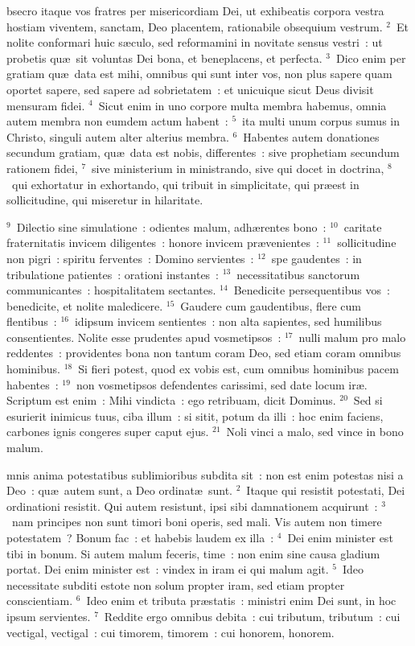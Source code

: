 \bchapter
{}bsecro itaque vos fratres per misericordiam Dei, ut exhibeatis corpora vestra hostiam viventem, sanctam, Deo placentem, rationabile obsequium vestrum.
${}^{2}$~Et nolite conformari huic s\ae culo, sed reformamini in novitate sensus vestri~: ut probetis qu\ae\ sit voluntas Dei bona, et beneplacens, et perfecta.
${}^{3}$~Dico enim per gratiam qu\ae\ data est mihi, omnibus qui sunt inter vos, non plus sapere quam oportet sapere, sed sapere ad sobrietatem~: et unicuique sicut Deus divisit mensuram fidei.
${}^{4}$~Sicut enim in uno corpore multa membra habemus, omnia autem membra non eumdem actum habent~:
${}^{5}$~ita multi unum corpus sumus in Christo, singuli autem alter alterius membra.
${}^{6}$~Habentes autem donationes secundum gratiam, qu\ae\ data est nobis, differentes~: sive prophetiam secundum rationem fidei,
${}^{7}$~sive ministerium in ministrando, sive qui docet in doctrina,
${}^{8}$~qui exhortatur in exhortando, qui tribuit in simplicitate, qui pr\ae est in sollicitudine, qui miseretur in hilaritate.


${}^{9}$~Dilectio sine simulatione~: odientes malum, adh\ae rentes bono~:
${}^{10}$~caritate fraternitatis invicem diligentes~: honore invicem pr\ae venientes~:
${}^{11}$~sollicitudine non pigri~: spiritu ferventes~: Domino servientes~:
${}^{12}$~spe gaudentes~: in tribulatione patientes~: orationi instantes~:
${}^{13}$~necessitatibus sanctorum communicantes~: hospitalitatem sectantes.
${}^{14}$~Benedicite persequentibus vos~: benedicite, et nolite maledicere.
${}^{15}$~Gaudere cum gaudentibus, flere cum flentibus~:
${}^{16}$~idipsum invicem sentientes~: non alta sapientes, sed humilibus consentientes. Nolite esse prudentes apud vosmetipsos~:
${}^{17}$~nulli malum pro malo reddentes~: providentes bona non tantum coram Deo, sed etiam coram omnibus hominibus.
${}^{18}$~Si fieri potest, quod ex vobis est, cum omnibus hominibus pacem habentes~:
${}^{19}$~non vosmetipsos defendentes carissimi, sed date locum ir\ae . Scriptum est enim~: Mihi vindicta~: ego retribuam, dicit Dominus.
${}^{20}$~Sed si esurierit inimicus tuus, ciba illum~: si sitit, potum da illi~: hoc enim faciens, carbones ignis congeres super caput ejus.
${}^{21}$~Noli vinci a malo, sed vince in bono malum.

\bchapter
{}mnis anima potestatibus sublimioribus subdita sit~: non est enim potestas nisi a Deo~: qu\ae\ autem sunt, a Deo ordinat\ae\ sunt.
${}^{2}$~Itaque qui resistit potestati, Dei ordinationi resistit. Qui autem resistunt, ipsi sibi damnationem acquirunt~:
${}^{3}$~nam principes non sunt timori boni operis, sed mali. Vis autem non timere potestatem~? Bonum fac~: et habebis laudem ex illa~:
${}^{4}$~Dei enim minister est tibi in bonum. Si autem malum feceris, time~: non enim sine causa gladium portat. Dei enim minister est~: vindex in iram ei qui malum agit.
${}^{5}$~Ideo necessitate subditi estote non solum propter iram, sed etiam propter conscientiam.
${}^{6}$~Ideo enim et tributa pr\ae statis~: ministri enim Dei sunt, in hoc ipsum servientes.
${}^{7}$~Reddite ergo omnibus debita~: cui tributum, tributum~: cui vectigal, vectigal~: cui timorem, timorem~: cui honorem, honorem.


